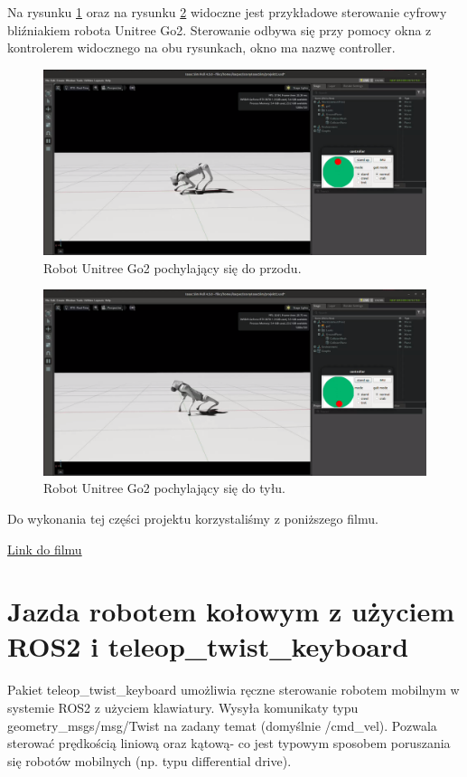 \documentclass[12pt]{article}
\begin{document}
 
Na rysunku \ref{fig:pochyleniePrzod} oraz na rysunku \ref{fig:pochylenieTyl} widoczne jest przykładowe sterowanie cyfrowy bliźniakiem robota Unitree Go2. Sterowanie odbywa się przy pomocy okna z kontrolerem widocznego na obu rysunkach, okno ma nazwę controller.



\begin{figure}[h]
    \centering
    \includegraphics[width=0.75\linewidth]{Zdjęcia/pochyleniePrzod.png}
    \caption{Robot Unitree Go2 pochylający się do przodu.}
    \label{fig:pochyleniePrzod}
\end{figure}

\begin{figure}[h]
    \centering
    \includegraphics[width=0.75\linewidth]{Zdjęcia/pochylenieTyl.png}
    \caption{Robot Unitree Go2 pochylający się do tyłu.}
    \label{fig:pochylenieTyl}
\end{figure}

Do wykonania tej części projektu korzystaliśmy z poniższego filmu.

\href{https://www.youtube.com/watch?v=L1rpxRm0Q1w&t=581s}{Link do filmu}

\clearpage

\section{Jazda robotem kołowym z użyciem ROS2 i teleop\_twist\_keyboard}

Pakiet teleop\_twist\_keyboard umożliwia ręczne sterowanie robotem mobilnym w systemie ROS2 z użyciem klawiatury. Wysyła komunikaty typu geometry\_msgs/msg/Twist na zadany temat (domyślnie /cmd\_vel). Pozwala sterować prędkością liniową oraz kątową- co jest typowym sposobem poruszania się robotów mobilnych (np. typu differential drive).
\end{document}
